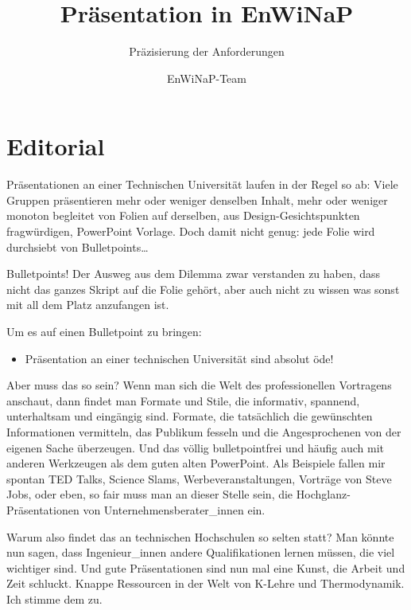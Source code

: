 \documentclass[DIV=15,headinclude=true]{scrartcl}
\begin{document}
\title{Präsentation in EnWiNaP}
\subtitle{Präzisierung der Anforderungen}
\author{EnWiNaP-Team}
\maketitle



\section*{Editorial}

Präsentationen an einer Technischen Universität laufen in der Regel so
ab: Viele Gruppen präsentieren mehr oder weniger denselben Inhalt, mehr
oder weniger monoton begleitet von Folien auf derselben, aus
Design-Gesichtspunkten fragwürdigen, PowerPoint Vorlage. Doch damit
nicht genug: jede Folie wird durchsiebt von Bulletpoints\ldots{}

Bulletpoints! Der Ausweg aus dem Dilemma zwar verstanden zu haben, dass
nicht das ganzes Skript auf die Folie gehört, aber auch nicht zu wissen
was sonst mit all dem Platz anzufangen ist.

Um es auf einen Bulletpoint zu bringen:

\begin{itemize}
	\item
	      Präsentation an einer technischen Universität sind absolut öde!
\end{itemize}

Aber muss das so sein? Wenn man sich die Welt des professionellen
Vortragens anschaut, dann findet man Formate und Stile, die informativ,
spannend, unterhaltsam und eingängig sind. Formate, die tatsächlich die
gewünschten Informationen vermitteln, das Publikum fesseln und die
Angesprochenen von der eigenen Sache überzeugen. Und das völlig
bulletpointfrei und häufig auch mit anderen Werkzeugen als dem guten
alten PowerPoint. Als Beispiele fallen mir spontan TED Talks, Science
Slams, Werbeveranstaltungen, Vorträge von Steve Jobs, oder eben, so fair
muss man an dieser Stelle sein, die Hochglanz-Präsentationen von
Unternehmensberater\_innen ein.

Warum also findet das an technischen Hochschulen so selten statt? Man
könnte nun sagen, dass Ingenieur\_innen andere Qualifikationen lernen
müssen, die viel wichtiger sind. Und gute Präsentationen sind nun mal
eine Kunst, die Arbeit und Zeit schluckt. Knappe Ressourcen in der Welt
von K-Lehre und Thermodynamik. Ich stimme dem zu.
\end{document}
